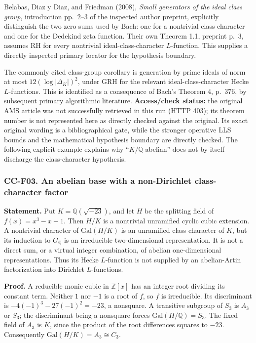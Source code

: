 \documentclass[11pt,a4paper]{article}
\theoremstyle{definition}\newtheorem{definition}[theorem]{Definition}
\theoremstyle{remark}\newtheorem{remark}[theorem]{Remark}
\begin{document}
Belabas, Diaz y Diaz, and Friedman (2008), \emph{Small generators of the
ideal class group}, introduction pp.~2--3 of the inspected author
preprint, explicitly distinguish the two zero sums used by Bach: one for
a nontrivial class character and one for the Dedekind zeta function.
Their own Theorem 1.1, preprint p.~3, assumes RH for every nontrivial
ideal-class-character \(L\)-function. This supplies a directly inspected
primary locator for the hypothesis boundary.

The commonly cited class-group corollary is generation by prime ideals
of norm at most \(12(\log|\Delta_K|)^2\), under GRH for the relevant
ideal-class-character Hecke \(L\)-functions. This is identified as a
consequence of Bach's Theorem 4, p.~376, by subsequent primary
algorithmic literature. \textbf{Access/check status:} the original AMS
article was not successfully retrieved in this run (HTTP 403); its
theorem number is not represented here as directly checked against the
original. Its exact original wording is a bibliographical gate, while
the stronger operative LLS bounds and the mathematical hypothesis
boundary are directly checked. The following explicit example explains
why ``\(K/\mathbb Q\) abelian'' does not by itself discharge the
class-character hypothesis.

\subsubsection{CC-F03. An abelian base with a non-Dirichlet
class-character
factor}\label{cc-f03.-an-abelian-base-with-a-non-dirichlet-class-character-factor}

\textbf{Statement.} Put \(K=\mathbb Q(\sqrt{-23})\), and let \(H\) be
the splitting field of \(f(x)=x^3-x-1\). Then \(H/K\) is a nontrivial
unramified cyclic cubic extension. A nontrivial character of
\(\mathrm{Gal}(H/K)\) is an unramified class character of \(K\), but its
induction to \(G_\mathbb Q\) is an irreducible two-dimensional
representation. It is not a direct sum, or a virtual integer
combination, of abelian one-dimensional representations. Thus its Hecke
\(L\)-function is not supplied by an abelian-Artin factorization into
Dirichlet \(L\)-functions.

\textbf{Proof.} A reducible monic cubic in \(\mathbb Z[x]\) has an
integer root dividing its constant term. Neither \(1\) nor \(-1\) is a
root of \(f\), so \(f\) is irreducible. Its discriminant is
\(-4(-1)^3-27(-1)^2=-23\), a nonsquare. A transitive subgroup of \(S_3\)
is \(A_3\) or \(S_3\); the discriminant being a nonsquare forces
\(\mathrm{Gal}(H/\mathbb Q)=S_3\). The fixed field of \(A_3\) is \(K\),
since the product of the root differences squares to \(-23\).
Consequently \(\mathrm{Gal}(H/K)=A_3\cong C_3\).
\end{document}
